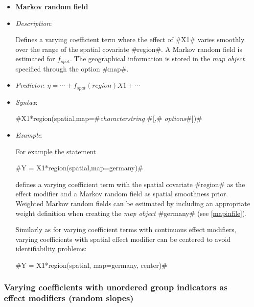 \begin{itemize}
\item[]{\bf\sffamily Markov random field}

\item[] {\em Description}:

Defines a varying coefficient term where the effect of #X1# varies
smoothly over the range of the spatial covariate #region#. A
Markov random field is estimated for $f_{spat}$. The geographical
information is stored in the {\em map object} specified through the
option #map#.
\item[] {\em Predictor}: $\eta = \cdots + f_{spat}(region)X1 + \cdots$
\item[] {\em Syntax}:

#X1*region(spatial,map=#{\it characterstring} #[,# {\it options}#])#
\item[] {\em Example}:

For example the statement

#Y = X1*region(spatial,map=germany)#

defines a varying coefficient term with the spatial covariate
#region# as the effect modifier and a Markov random field as spatial
smoothness prior. Weighted Markov random fields can be estimated by
including an appropriate weight definition when creating the {\em
map object} #germany# (see \autoref{mapinfile}).

Similarly as for varying coefficient terms with continuous effect
modifiers, varying coefficients with spatial effect modifier can be
centered to avoid identifiability problems:

#Y = X1*region(spatial, map=germany, center)#

\end{itemize}

\subsubsection*{Varying coefficients with unordered group indicators
as effect modifiers (random slopes)}

